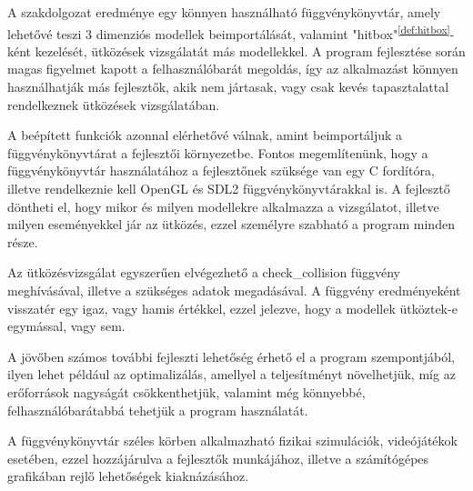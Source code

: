 
A szakdolgozat eredménye egy könnyen használható függvénykönyvtár, amely lehetővé teszi 3 dimenziós modellek beimportálását, valamint "hitbox"\textsuperscript{\ref{def:hitbox}}-ként kezelését, ütközések vizsgálatát más modellekkel. A program fejlesztése során magas figyelmet kapott a felhasználóbarát megoldás, így az alkalmazást könnyen használhatják más fejlesztők, akik nem jártasak, vagy csak kevés tapasztalattal rendelkeznek ütközések vizsgálatában.

A beépített funkciók azonnal elérhetővé válnak, amint beimportáljuk a függvénykönyvtárat a fejlesztői környezetbe. Fontos megemlítenünk, hogy a függvénykönyvtár használatához a fejlesztőnek szüksége van egy C fordítóra, illetve rendelkeznie kell OpenGL\cite{OpenGL} és SDL2\cite{SDL2} függvénykönyvtárakkal is. A fejlesztő döntheti el, hogy mikor és milyen modellekre alkalmazza a vizsgálatot, illetve milyen eseményekkel jár az ütközés, ezzel személyre szabható a program minden része.

Az ütközésvizsgálat egyszerűen elvégezhető a check\_collision függvény meghívásával, illetve a szükséges adatok megadásával. A függvény eredményeként visszatér egy igaz, vagy hamis értékkel, ezzel jelezve, hogy a modellek ütköztek-e egymással, vagy sem.

A jövőben számos további fejleszti lehetőség érhető el a program szempontjából, ilyen lehet például az optimalizálás, amellyel a teljesítményt növelhetjük, míg az erőforrások nagyságát csökkenthetjük, valamint még könnyebbé, felhasználóbarátabbá tehetjük a program használatát.

A függvénykönyvtár széles körben alkalmazható fizikai szimulációk, videójátékok esetében, ezzel hozzájárulva a fejlesztők munkájához, illetve a számítógépes grafikában rejlő lehetőségek kiaknázásához.